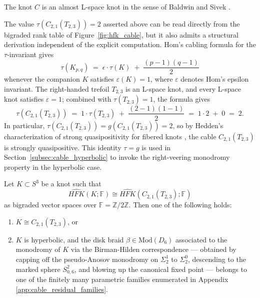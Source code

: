 The knot $C$ is an almost L-space knot in the sense of Baldwin and Sivek \cite{BaldwinSivek2024}.

\begin{remark}[Derivation of $\tau(C_{2,1}(T_{2,3})) = 2$]\label{rem:tau_cable_derivation}
The value $\tau(C_{2,1}(T_{2,3})) = 2$ asserted above can be read directly from the bigraded rank table of Figure~\ref{fig:hfk_cable}, but it also admits a structural derivation independent of the explicit computation. Hom's cabling formula for the $\tau$-invariant \cite{HomCabling2014} gives
\[
\tau(K_{p,q}) \;=\; \epsilon \cdot \tau(K) \;+\; \frac{(p-1)(q-1)}{2}
\]
whenever the companion $K$ satisfies $\varepsilon(K) = 1$, where $\varepsilon$ denotes Hom's epsilon invariant. The right-handed trefoil $T_{2,3}$ is an L-space knot, and every L-space knot satisfies $\varepsilon = 1$; combined with $\tau(T_{2,3}) = 1$, the formula gives
\[
\tau(C_{2,1}(T_{2,3})) \;=\; 1 \cdot \tau(T_{2,3}) \;+\; \frac{(2-1)(1-1)}{2} \;=\; 1 \cdot 2 \;+\; 0 \;=\; 2.
\]
In particular, $\tau(C_{2,1}(T_{2,3})) = g(C_{2,1}(T_{2,3})) = 2$, so by Hedden's characterization of strong quasipositivity for fibered knots \cite{Hedden2010}, the cable $C_{2,1}(T_{2,3})$ is strongly quasipositive. This identity $\tau = g$ is used in Section~\ref{subsec:cable_hyperbolic} to invoke the right-veering monodromy property in the hyperbolic case.
\end{remark}

\begin{theorem}\label{thm:cable_detection_partial}
Let $K \subset S^3$ be a knot such that
\[
\widehat{HFK}(K; \mathbb{F}) \cong \widehat{HFK}(C_{2,1}(T_{2,3}); \mathbb{F})
\]
as bigraded vector spaces over $\mathbb{F} = \mathbb{Z}/2\mathbb{Z}$. Then one of the following holds:
\begin{enumerate}
    \item $K \cong C_{2,1}(T_{2,3})$, or
    \item $K$ is hyperbolic, and the disk braid $\beta \in \mathrm{Mod}(D_6)$ associated to the monodromy of $K$ via the Birman-Hilden correspondence --- obtained by capping off the pseudo-Anosov monodromy on $\Sigma_2^1$ to $\Sigma_2^0$, descending to the marked sphere $S^2_{0,6}$, and blowing up the canonical fixed point --- belongs to one of the finitely many parametric families enumerated in Appendix \ref{app:cable_residual_families}.
\end{enumerate}
\end{theorem}

